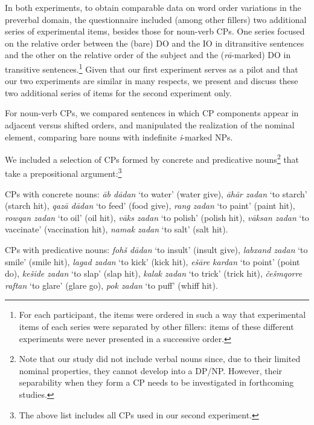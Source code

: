\documentclass[output=paper]{langsci/langscibook}
\begin{document}
In both experiments, to obtain comparable data on word order variations in the preverbal domain, the questionnaire included (among other fillers) two additional series of experimental items, besides those for noun-verb CPs. One series focused on the relative order between the (bare) DO and the IO in ditransitive sentences and the other on the relative order of the subject and the (\textit{r\=a}-marked) DO in transitive sentences.\footnote{For each participant, the items were ordered in such a way that experimental items of each series were separated by other fillers: items of these different experiments were never presented in a successive order.}
Given that our first experiment serves as a pilot and that our two experiments are similar in many respects, we present and discuss these two additional series of items for the second experiment only. 

For noun-verb CPs, we compared sentences in which CP components appear in adjacent versus shifted orders, and manipulated the realization of the nominal element, comparing bare nouns with indefinite \textit{i}-marked NPs. 

We included a selection of CPs formed by concrete and predicative nouns\footnote{Note that our study did not include verbal nouns since, due to their limited nominal properties, they cannot develop into a DP/NP. However, their separability when they form a CP needs to be investigated in forthcoming studies.} that take a prepositional argument:\footnote{The above list includes all CPs used in our second experiment.}

\begin{description}\label{ListCP}
	\item CPs with concrete nouns: \textit{\=ab d\=adan} `to water' (water give), \textit{\=ah\=ar zadan} `to starch' (starch hit), \textit{qaz\=a d\=adan} `to feed' (food give), \textit{rang zadan} `to paint' (paint hit), \textit{rowqan zadan} `to oil' (oil hit), \textit{v\=aks zadan} `to polish' (polish hit),  \textit{v\=aksan zadan} `to vaccinate' (vaccination hit), \textit{namak zadan} `to salt' (salt hit).
	\item CPs with predicative nouns: \textit{foh\v{s} d\=adan} `to insult' (insult give), \textit{labxand zadan} `to smile' (smile hit), \textit{lagad zadan} `to kick' (kick hit), \textit{e\v{s}\=are kardan} `to point' (point do), \textit{ke\v{s}ide zadan} `to slap' (slap hit), \textit{kalak zadan} `to trick' (trick hit), \textit{\v{c}e\v{s}mqorre raftan} `to glare' (glare go), \textit{pok zadan} `to puff' (whiff hit).
\end{description}
\end{document}
